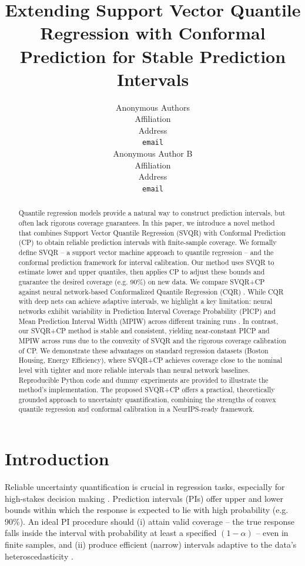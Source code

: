 \documentclass{article}
\title{Extending Support Vector Quantile Regression with Conformal Prediction for Stable Prediction Intervals}
\author{
  Anonymous Authors \\
  Affiliation \\
  Address \\
  \texttt{email} \\
  \And
  Anonymous Author B \\
  Affiliation \\
  Address \\
  \texttt{email} \\
}
\begin{document}
\maketitle

\begin{abstract}
Quantile regression models provide a natural way to construct prediction intervals, but often lack rigorous coverage guarantees. In this paper, we introduce a novel method that combines Support Vector Quantile Regression (SVQR) with Conformal Prediction (CP) to obtain reliable prediction intervals with finite-sample coverage. We formally define SVQR -- a support vector machine approach to quantile regression -- and the conformal prediction framework for interval calibration. Our method uses SVQR to estimate lower and upper quantiles, then applies CP to adjust these bounds and guarantee the desired coverage (e.g. 90\%) on new data. We compare SVQR+CP against neural network-based Conformalized Quantile Regression (CQR) \citep{Romano2019ConformalizedQR}. While CQR with deep nets can achieve adaptive intervals, we highlight a key limitation: neural networks exhibit variability in Prediction Interval Coverage Probability (PICP) and Mean Prediction Interval Width (MPIW) across different training runs \citep{Park2022UnderstandingUB, Xu2020UnderTH}. In contrast, our SVQR+CP method is stable and consistent, yielding near-constant PICP and MPIW across runs due to the convexity of SVQR and the rigorous coverage calibration of CP. We demonstrate these advantages on standard regression datasets (Boston Housing, Energy Efficiency), where SVQR+CP achieves coverage close to the nominal level with tighter and more reliable intervals than neural network baselines. Reproducible Python code and dummy experiments are provided to illustrate the method's implementation. The proposed SVQR+CP offers a practical, theoretically grounded approach to uncertainty quantification, combining the strengths of convex quantile regression and conformal calibration in a NeurIPS-ready framework.
\end{abstract}


\section{Introduction}
Reliable uncertainty quantification is crucial in regression tasks, especially for high-stakes decision making \citep{Romano2019ConformalizedQR}. Prediction intervals (PIs) offer upper and lower bounds within which the response is expected to lie with high probability (e.g. 90\%). An ideal PI procedure should (i) attain valid coverage -- the true response falls inside the interval with probability at least a specified $(1-\alpha)$ -- even in finite samples, and (ii) produce efficient (narrow) intervals adaptive to the data's heteroscedasticity \citep{Romano2019ConformalizedQR}.
\end{document}
